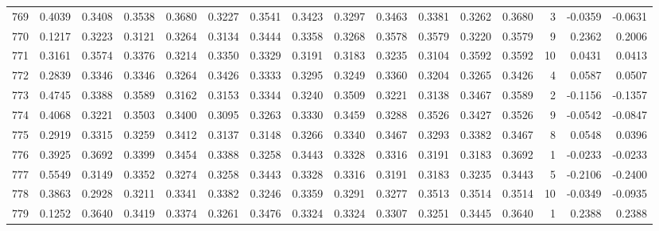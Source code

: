 \begin{tabular}{lrrrrrrrrrrrrrrr}
769 &      0.4039 &  0.3408 &  0.3538 &  0.3680 &  0.3227 &  0.3541 &  0.3423 &  0.3297 &  0.3463 &  0.3381 &   0.3262 &     0.3680 &      3 &                   -0.0359 &                    -0.0631 \\
770 &      0.1217 &  0.3223 &  0.3121 &  0.3264 &  0.3134 &  0.3444 &  0.3358 &  0.3268 &  0.3578 &  0.3579 &   0.3220 &     0.3579 &      9 &                    0.2362 &                     0.2006 \\
771 &      0.3161 &  0.3574 &  0.3376 &  0.3214 &  0.3350 &  0.3329 &  0.3191 &  0.3183 &  0.3235 &  0.3104 &   0.3592 &     0.3592 &     10 &                    0.0431 &                     0.0413 \\
772 &      0.2839 &  0.3346 &  0.3346 &  0.3264 &  0.3426 &  0.3333 &  0.3295 &  0.3249 &  0.3360 &  0.3204 &   0.3265 &     0.3426 &      4 &                    0.0587 &                     0.0507 \\
773 &      0.4745 &  0.3388 &  0.3589 &  0.3162 &  0.3153 &  0.3344 &  0.3240 &  0.3509 &  0.3221 &  0.3138 &   0.3467 &     0.3589 &      2 &                   -0.1156 &                    -0.1357 \\
774 &      0.4068 &  0.3221 &  0.3503 &  0.3400 &  0.3095 &  0.3263 &  0.3330 &  0.3459 &  0.3288 &  0.3526 &   0.3427 &     0.3526 &      9 &                   -0.0542 &                    -0.0847 \\
775 &      0.2919 &  0.3315 &  0.3259 &  0.3412 &  0.3137 &  0.3148 &  0.3266 &  0.3340 &  0.3467 &  0.3293 &   0.3382 &     0.3467 &      8 &                    0.0548 &                     0.0396 \\
776 &      0.3925 &  0.3692 &  0.3399 &  0.3454 &  0.3388 &  0.3258 &  0.3443 &  0.3328 &  0.3316 &  0.3191 &   0.3183 &     0.3692 &      1 &                   -0.0233 &                    -0.0233 \\
777 &      0.5549 &  0.3149 &  0.3352 &  0.3274 &  0.3258 &  0.3443 &  0.3328 &  0.3316 &  0.3191 &  0.3183 &   0.3235 &     0.3443 &      5 &                   -0.2106 &                    -0.2400 \\
778 &      0.3863 &  0.2928 &  0.3211 &  0.3341 &  0.3382 &  0.3246 &  0.3359 &  0.3291 &  0.3277 &  0.3513 &   0.3514 &     0.3514 &     10 &                   -0.0349 &                    -0.0935 \\
779 &      0.1252 &  0.3640 &  0.3419 &  0.3374 &  0.3261 &  0.3476 &  0.3324 &  0.3324 &  0.3307 &  0.3251 &   0.3445 &     0.3640 &      1 &                    0.2388 &                     0.2388 \\

\end{tabular}
